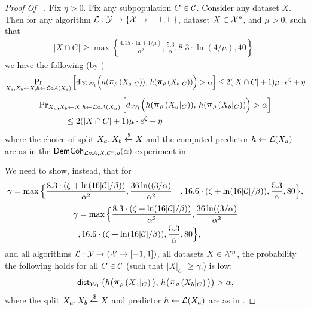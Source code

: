 \begin{proof}[Proof Of ~]

Fix $\eta > 0$. Fix any subpopulation $C \in \mathcal{C}$. Consider any dataset $X$. Then for any algorithm $\mathcal{L}:\mathcal{Y}\to\{\mathcal{X}\to [-1,1]\}$, dataset $X \in \mathcal{X}^n$, and $\mu > 0$, such that \begin{align}\label{eq:condgrpsize}
        |X\cap C|\ge \max\left\{\frac{4.15\cdot\ln(4/\mu)}{\alpha^2}, \frac{5.3}{\alpha},8.3\cdot\ln(4/\mu), 40\right\},
    \end{align}
we have the following (by )
 \ifnum{}   \begin{equation}\label{eq:probdemcoh}
        \Pr_{X_a,X_b \leftarrow X, h\leftarrow\cL\circ\alg(X_a)}\left[ \wdist\Big(h(\restrict{X_a|_C}{\selection}),\, h(\restrict{X_b|_C}{\selection})\Big) > \alpha \right] \leq  2(|X\cap C|+1)\mu\cdot e^{\zeta} +\eta
    \end{equation} 
\else
\begin{align}\label{eq:probdemcoh}
        \Pr&_{X_a,X_b \leftarrow X, h\leftarrow\cL\circ\alg(X_a)}\left[ d_{\mathcal{W}_1}\Big(h(\restrict{X_a|_C}{\selection}),\, h(\restrict{X_b|_C}{\selection})\Big) > \alpha \right] \nonumber \\
        & \qquad \leq  2(|X\cap C|+1)\mu\cdot e^{\zeta} +\eta
    \end{align} 
\fi
where the choice of split $X_a,X_b \xleftarrow{\$} X$ and the computed predictor $h\leftarrow \mathcal{L}(X_a)$ are as in the $\mathsf{DemCoh}_{\mathcal{L}\circ\mathcal{A},X,\mathcal{C}^*,\rho}(\alpha)$ experiment in . 
    
We need to show, instead, that for
\ifnum{}
\begin{align*}
\gamma = \max\Big\{ & \frac{8.3 \cdot (\zeta + \ln(16|\mathcal{C}|/\beta))}{\alpha^2}, \frac{36\ln((3/\alpha)}{\alpha^2} \nonumber &, 16.6 \cdot (\zeta + \ln(16|\mathcal{C}|/\beta)), \frac{5.3}{\alpha}, 80\Big\},
\end{align*}
\else
\begin{align*}
\gamma & = \max\Big\{ \frac{8.3 \cdot (\zeta + \ln(16|\mathcal{C}|/\beta))}{\alpha^2}, \frac{36\ln((3/\alpha)} {\alpha^2} \nonumber \\ 
&, 16.6 \cdot (\zeta + \ln(16|\mathcal{C}|/\beta)), \frac{5.3}{\alpha}, 80\Big\},
\end{align*}
\fi
and all algorithms $\mathcal{L}:\mathcal{Y}\to(\mathcal{X}\to[-1,1])$, all datasets $X \in \mathcal{X}^n$, the probability the following holds for all $C \in \mathcal{C}$ (such that $|X|_C| \geq \gamma$,) is low:
 \[\wdist\left( h\big(\restrict{X_a|_C}{\selection}\big),\, h\big(\restrict{X_b|_C}{\selection}\big) \right) > \alpha,\]
where the split $X_a,X_b \xleftarrow{\$} X$ and predictor $h\leftarrow \mathcal{L}(X_a)$ are as in .


\end{proof}
